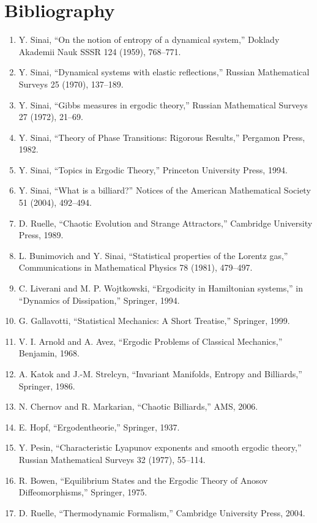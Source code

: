 \section*{Bibliography}
\begin{enumerate}
\item Y. Sinai, ``On the notion of entropy of a dynamical system,'' Doklady Akademii Nauk SSSR 124 (1959), 768--771.
\item Y. Sinai, ``Dynamical systems with elastic reflections,'' Russian Mathematical Surveys 25 (1970), 137--189.
\item Y. Sinai, ``Gibbs measures in ergodic theory,'' Russian Mathematical Surveys 27 (1972), 21--69.
\item Y. Sinai, ``Theory of Phase Transitions: Rigorous Results,'' Pergamon Press, 1982.
\item Y. Sinai, ``Topics in Ergodic Theory,'' Princeton University Press, 1994.
\item Y. Sinai, ``What is a billiard?'' Notices of the American Mathematical Society 51 (2004), 492--494.
\item D. Ruelle, ``Chaotic Evolution and Strange Attractors,'' Cambridge University Press, 1989.
\item L. Bunimovich and Y. Sinai, ``Statistical properties of the Lorentz gas,'' Communications in Mathematical Physics 78 (1981), 479--497.
\item C. Liverani and M. P. Wojtkowski, ``Ergodicity in Hamiltonian systems,'' in ``Dynamics of Dissipation,'' Springer, 1994.
\item G. Gallavotti, ``Statistical Mechanics: A Short Treatise,'' Springer, 1999.
\item V. I. Arnold and A. Avez, ``Ergodic Problems of Classical Mechanics,'' Benjamin, 1968.
\item A. Katok and J.-M. Strelcyn, ``Invariant Manifolds, Entropy and Billiards,'' Springer, 1986.
\item N. Chernov and R. Markarian, ``Chaotic Billiards,'' AMS, 2006.
\item E. Hopf, ``Ergodentheorie,'' Springer, 1937.
\item Y. Pesin, ``Characteristic Lyapunov exponents and smooth ergodic theory,'' Russian Mathematical Surveys 32 (1977), 55--114.
\item R. Bowen, ``Equilibrium States and the Ergodic Theory of Anosov Diffeomorphisms,'' Springer, 1975.
\item D. Ruelle, ``Thermodynamic Formalism,'' Cambridge University Press, 2004.

\end{enumerate}
